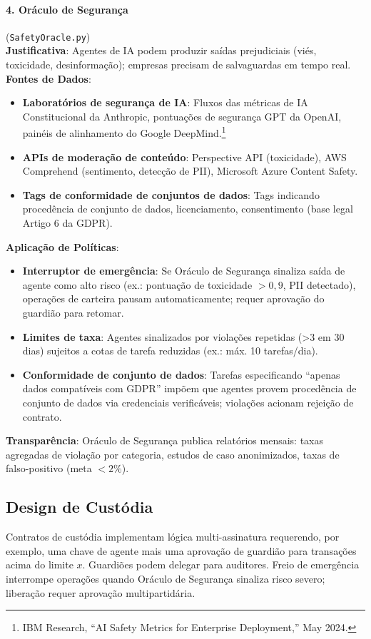 \documentclass[11pt]{article}
\begin{document}
\paragraph{4. Oráculo de Segurança} (\texttt{SafetyOracle.py})\\
\textbf{Justificativa}: Agentes de IA podem produzir saídas prejudiciais (viés, toxicidade, desinformação); empresas precisam de salvaguardas em tempo real.\\
\textbf{Fontes de Dados}:
\begin{itemize}[noitemsep]
  \item \textbf{Laboratórios de segurança de IA}: Fluxos das métricas de IA Constitucional da Anthropic, pontuações de segurança GPT da OpenAI, painéis de alinhamento do Google DeepMind.\footnote{IBM Research, ``AI Safety Metrics for Enterprise Deployment,'' May 2024.}
  \item \textbf{APIs de moderação de conteúdo}: Perspective API (toxicidade), AWS Comprehend (sentimento, detecção de PII), Microsoft Azure Content Safety.
  \item \textbf{Tags de conformidade de conjuntos de dados}: Tags indicando procedência de conjunto de dados, licenciamento, consentimento (base legal Artigo 6 da GDPR).
\end{itemize}
\textbf{Aplicação de Políticas}:
\begin{itemize}[noitemsep]
  \item \textbf{Interruptor de emergência}: Se Oráculo de Segurança sinaliza saída de agente como alto risco (ex.: pontuação de toxicidade $>0,9$, PII detectado), operações de carteira pausam automaticamente; requer aprovação do guardião para retomar.
  \item \textbf{Limites de taxa}: Agentes sinalizados por violações repetidas (>3 em 30 dias) sujeitos a cotas de tarefa reduzidas (ex.: máx. 10 tarefas/dia).
  \item \textbf{Conformidade de conjunto de dados}: Tarefas especificando ``apenas dados compatíveis com GDPR'' impõem que agentes provem procedência de conjunto de dados via credenciais verificáveis; violações acionam rejeição de contrato.
\end{itemize}
\textbf{Transparência}: Oráculo de Segurança publica relatórios mensais: taxas agregadas de violação por categoria, estudos de caso anonimizados, taxas de falso-positivo (meta $<2\%$).

\subsection{Design de Custódia}
Contratos de custódia implementam lógica multi-assinatura requerendo, por exemplo, uma chave de agente mais uma aprovação de guardião para transações acima do limite $x$. Guardiões podem delegar para auditores. Freio de emergência interrompe operações quando Oráculo de Segurança sinaliza risco severo; liberação requer aprovação multipartidária.
\end{document}
